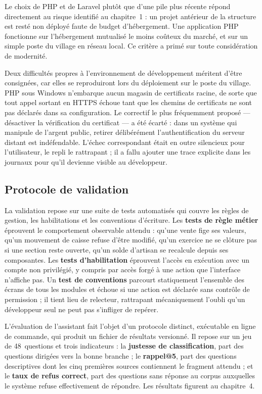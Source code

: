 Le choix de PHP et de Laravel plutôt que d'une pile plus récente répond directement au risque identifié au chapitre~1 : un projet antérieur de la structure est resté non déployé faute de budget d'hébergement. Une application PHP fonctionne sur l'hébergement mutualisé le moins coûteux du marché, et sur un simple poste du village en réseau local. Ce critère a primé sur toute considération de modernité.

Deux difficultés propres à l'environnement de développement méritent d'être consignées, car elles se reproduiront lors du déploiement sur le poste du village. PHP sous Windows n'embarque aucun magasin de certificats racine, de sorte que tout appel sortant en HTTPS échoue tant que les chemins de certificats ne sont pas déclarés dans sa configuration. Le correctif le plus fréquemment proposé --- désactiver la vérification du certificat --- a été écarté : dans un système qui manipule de l'argent public, retirer délibérément l'authentification du serveur distant est indéfendable. L'échec correspondant était en outre silencieux pour l'utilisateur, le repli le rattrapant ; il a fallu ajouter une trace explicite dans les journaux pour qu'il devienne visible au développeur.

\subsection{Protocole de validation}

La validation repose sur une suite de tests automatisés qui couvre les règles de gestion, les habilitations et les conventions d'écriture. Les \textbf{tests de règle métier} éprouvent le comportement observable attendu : qu'une vente fige ses valeurs, qu'un mouvement de caisse refuse d'être modifié, qu'un exercice ne se clôture pas si une section reste ouverte, qu'un solde d'artisan se recalcule depuis ses composantes. Les \textbf{tests d'habilitation} éprouvent l'accès en exécution avec un compte non privilégié, y compris par accès forgé à une action que l'interface n'affiche pas. Un \textbf{test de conventions} parcourt statiquement l'ensemble des écrans de tous les modules et échoue si une action est déclarée sans contrôle de permission ; il tient lieu de relecteur, rattrapant mécaniquement l'oubli qu'un développeur seul ne peut pas s'infliger de repérer.

L'évaluation de l'assistant fait l'objet d'un protocole distinct, exécutable en ligne de commande, qui produit un fichier de résultats versionné. Il repose sur un jeu de 48~questions et trois indicateurs : la \textbf{justesse de classification}, part des questions dirigées vers la bonne branche ; le \textbf{rappel@5}, part des questions descriptives dont les cinq premières sources contiennent le fragment attendu ; et le \textbf{taux de refus correct}, part des questions sans réponse au corpus auxquelles le système refuse effectivement de répondre. Les résultats figurent au chapitre~4.

